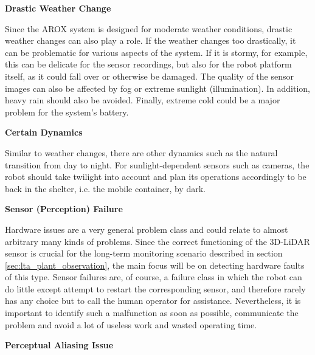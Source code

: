 \documentclass[english, master, utf8]{base/thesis_KBS}
\begin{document}
\noindent
\textbf{Drastic Weather Change}\newline

\noindent
Since the AROX system is designed for moderate weather conditions, drastic weather changes can also play a role.
If the weather changes too drastically, it can be problematic for various aspects of the system.
If it is stormy, for example, this can be delicate for the sensor recordings, but also for the robot platform itself, as it could fall over or otherwise be damaged.
The quality of the sensor images can also be affected by fog or extreme sunlight (illumination).
In addition, heavy rain should also be avoided. Finally, extreme cold could be a major problem for the system's battery.\newline

\noindent
\textbf{Certain Dynamics}\newline

\noindent
Similar to weather changes, there are other dynamics such as the natural transition from day to night. For sunlight-dependent sensors such as cameras, 
the robot should take twilight into account and plan its operations accordingly to be back in the shelter, i.e. the mobile container, by dark.\newline

\noindent
\textbf{Sensor (Perception) Failure}\newline

\noindent
Hardware issues are a very general problem class and could relate to almost arbitrary many kinds of problems. Since the correct functioning of the 3D-LiDAR sensor is
crucial for the long-term monitoring scenario described in section \ref{sec:lta_plant_observation}, the main focus will be on detecting hardware faults of this type. 
Sensor failures are, of course, a failure class in which the robot can do little except attempt to restart the corresponding sensor, and therefore rarely has any choice but to 
call the human operator for assistance. Nevertheless, it is important to identify such a malfunction as soon as possible, communicate the problem and avoid a lot of useless work 
and wasted operating time.\newline

\noindent
\textbf{Perceptual Aliasing Issue}\newline
\end{document}
